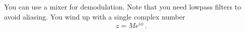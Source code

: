 
You can use a mixer for demodulation.
Note that you need lowpass filters to avoid aliasing.
You wind up with a single complex number
\begin{displaymath}
z = M e^{i \phi} \, .
\end{displaymath}
